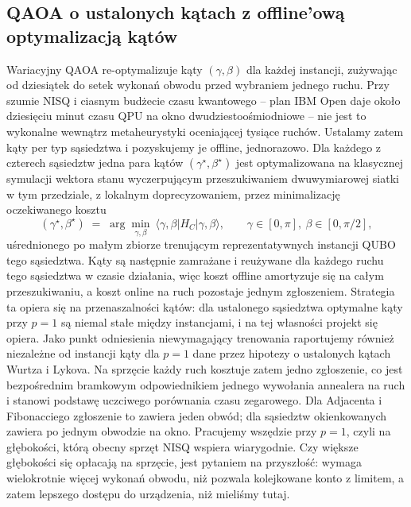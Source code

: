 \documentclass[11pt,a4paper]{article}
\begin{document}
\subsection{QAOA o ustalonych kątach z offline'ową optymalizacją kątów}
\label{subsec:fixed}
Wariacyjny QAOA re-optymalizuje kąty $(\gamma,\beta)$ dla każdej instancji,
zużywając od dziesiątek do setek wykonań obwodu przed wybraniem jednego ruchu.
Przy szumie NISQ i ciasnym budżecie czasu kwantowego -- plan IBM Open daje
około dziesięciu minut czasu QPU na okno dwudziestoośmiodniowe -- nie jest to
wykonalne wewnątrz metaheurystyki oceniającej tysiące ruchów. Ustalamy zatem
kąty per typ sąsiedztwa i pozyskujemy je offline, jednorazowo. Dla każdego
z czterech sąsiedztw jedna para kątów $(\gamma^\star,\beta^\star)$ jest
optymalizowana na klasycznej symulacji wektora stanu wyczerpującym
przeszukiwaniem dwuwymiarowej siatki w tym przedziale, z lokalnym
doprecyzowaniem, przez minimalizację oczekiwanego kosztu
\begin{equation}
  (\gamma^\star,\beta^\star)
  \;=\; \arg\min_{\gamma,\beta}\
  \langle\gamma,\beta\lvert H_C\rvert\gamma,\beta\rangle,
  \qquad \gamma\in[0,\pi],\ \beta\in[0,\pi/2],
  \label{eq:angleopt}
\end{equation}
uśrednionego po małym zbiorze trenującym reprezentatywnych instancji QUBO tego
sąsiedztwa. Kąty są następnie zamrażane i reużywane dla każdego ruchu tego
sąsiedztwa w czasie działania, więc koszt offline amortyzuje się na całym
przeszukiwaniu, a koszt online na ruch pozostaje jednym zgłoszeniem.
Strategia ta opiera się na przenaszalności kątów: dla ustalonego sąsiedztwa
optymalne kąty przy $p=1$ są niemal stałe między instancjami, i na tej
własności projekt się opiera. Jako punkt odniesienia niewymagający trenowania
raportujemy również niezależne od instancji kąty dla $p=1$ dane przez hipotezy
o ustalonych kątach Wurtza i Lykova. Na sprzęcie każdy ruch kosztuje zatem
jedno zgłoszenie, co jest bezpośrednim bramkowym odpowiednikiem jednego
wywołania annealera na ruch i stanowi podstawę uczciwego porównania czasu
zegarowego. Dla Adjacenta i Fibonacciego zgłoszenie to zawiera jeden obwód;
dla sąsiedztw okienkowanych zawiera po jednym obwodzie na okno. Pracujemy
wszędzie przy $p=1$, czyli na głębokości, którą obecny sprzęt NISQ wspiera
wiarygodnie. Czy większe głębokości się opłacają na
sprzęcie, jest pytaniem na przyszłość: wymaga wielokrotnie więcej wykonań
obwodu, niż pozwala kolejkowane konto z limitem, a zatem lepszego dostępu do
urządzenia, niż mieliśmy tutaj.
\end{document}

